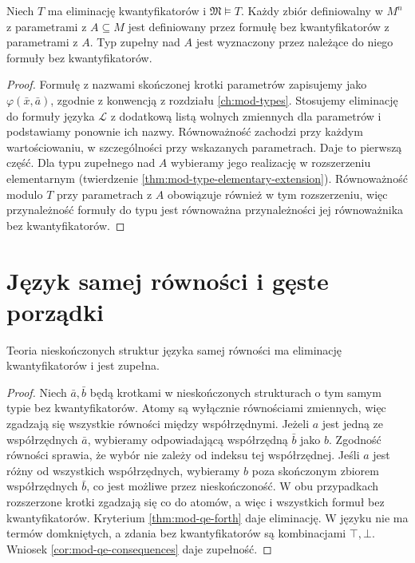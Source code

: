 \begin{wniosek}
\label{cor:mod-qe-definability}
Niech $T$ ma eliminację kwantyfikatorów i
$\mathfrak M\models T$. Każdy zbiór definiowalny
w $M^n$ z parametrami z $A\subseteq M$ jest definiowany
przez formułę bez kwantyfikatorów z parametrami z $A$.
Typ zupełny nad $A$ jest wyznaczony przez należące
do niego formuły bez kwantyfikatorów.
\end{wniosek}
\begin{proof}
Formułę z nazwami skończonej krotki parametrów zapisujemy
jako $\varphi(\bar x,\bar a)$, zgodnie z konwencją
z rozdziału \ref{ch:mod-types}. Stosujemy eliminację
do formuły języka $\mathcal L$ z dodatkową listą
wolnych zmiennych dla parametrów i podstawiamy
ponownie ich nazwy. Równoważność zachodzi przy każdym
wartościowaniu, w szczególności przy wskazanych
parametrach. Daje to pierwszą część.
Dla typu zupełnego nad $A$ wybieramy jego realizację
w rozszerzeniu elementarnym (twierdzenie
\ref{thm:mod-type-elementary-extension}).
Równoważność modulo $T$ przy parametrach z $A$
obowiązuje również w tym rozszerzeniu, więc przynależność
formuły do typu jest równoważna przynależności jej
równoważnika bez kwantyfikatorów.
\end{proof}

\section{Język samej równości i gęste porządki}
\begin{twierdzenie}
\label{thm:mod-qe-equality}
Teoria nieskończonych struktur języka samej równości
ma eliminację kwantyfikatorów i jest zupełna.
\end{twierdzenie}
\begin{proof}
Niech $\bar a,\bar b$ będą krotkami w nieskończonych
strukturach o tym samym typie bez kwantyfikatorów.
Atomy są wyłącznie równościami zmiennych, więc
zgadzają się wszystkie równości między współrzędnymi.
Jeżeli $a$ jest jedną ze współrzędnych $\bar a$,
wybieramy odpowiadającą współrzędną $\bar b$ jako $b$.
Zgodność równości sprawia, że wybór nie zależy od
indeksu tej współrzędnej. Jeśli $a$ jest różny od
wszystkich współrzędnych, wybieramy $b$ poza
skończonym zbiorem współrzędnych $\bar b$, co jest
możliwe przez nieskończoność. W obu przypadkach
rozszerzone krotki zgadzają się co do atomów, a więc
i wszystkich formuł bez kwantyfikatorów.
Kryterium \ref{thm:mod-qe-forth} daje eliminację.
W języku nie ma termów domkniętych, a zdania bez
kwantyfikatorów są kombinacjami $\top,\bot$.
Wniosek \ref{cor:mod-qe-consequences} daje zupełność.
\end{proof}

